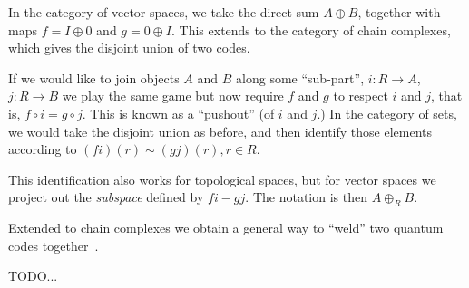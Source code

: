 In the category of vector spaces, we take the direct sum $A\oplus B$, together
with maps $f=I\oplus 0$ and $g=0\oplus I.$
This extends to the category of chain complexes, which 
gives the disjoint union of two codes.

If we would like to join objects $A$ and $B$ along some
``sub-part'', $i:R\to A$, $j:R\to B$ we play the same game
but now require $f$ and $g$ to respect $i$ and $j$, that is,
$f\circ i = g\circ j.$ This is known as a ``pushout'' (of $i$ and $j$.)
In the category of sets, we would take the disjoint union as
before, and then identify those elements according to $(fi)(r) \sim (gj)(r), r\in R.$

This identification also works for topological spaces,
but for vector spaces we project out the {\it subspace} defined
by $fi - gj.$ The notation is then $A\oplus_R B.$

Extended to chain complexes we obtain a general way to
``weld'' two quantum codes together~\cite{Michnicki12}.

TODO...




